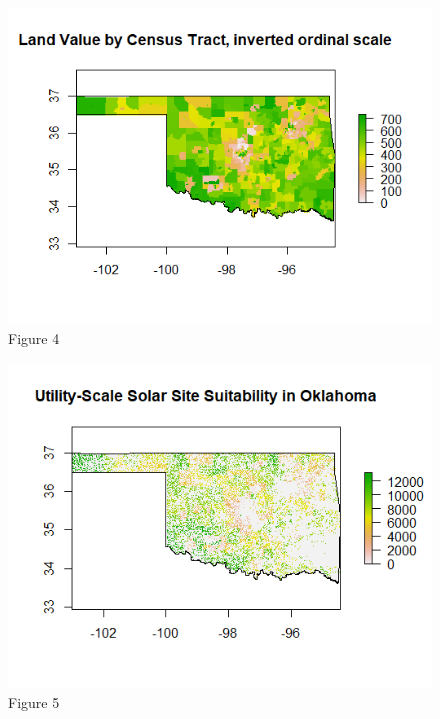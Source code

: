 \documentclass[12pt,english]{article}
\begin{document}



\begin{figure}[ht!]

\centering

\bigskip{}

\includegraphics[width=.9\linewidth]{Rvalue4.png}

\caption{Figure 4}

\label{fig:fig4}

\end{figure}




\begin{figure}[ht!]

\centering

\bigskip{}

\includegraphics[width=.9\linewidth]{Rfinalplot.png}

\caption{Figure 5}

\label{fig:fig5}

\end{figure}
\end{document}
